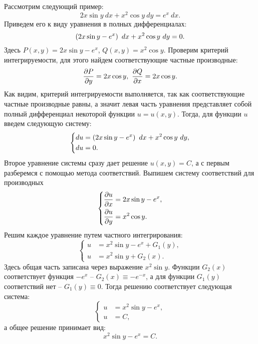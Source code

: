 		Рассмотрим следующий пример:
		\[ 2x \sin{y} ~ dx + x^2 \cos{y} ~ dy = e^{x} ~ dx. \]
		Приведем его к виду уравнения в полных дифференциалах:
		\[ \left( 2x \sin{y} - e^{x} \right) ~ dx + x^2 \cos{y} ~ dy = 0. \]
		Здесь $P(x, y) = 2x \sin{y} - e^{x}$, $Q(x, y) = x^2 \cos{y}$. Проверим критерий интегрируемости, для этого найдем соответствующие частные производные:
		\[ \dfrac{\partial P}{\partial y} = 2x \cos{y}, ~ \dfrac{\partial Q}{\partial x} = 2x \cos{y}. \]
		Как видим, критерий интегрируемости выполняется, так как соответствующие частные производные равны, а значит левая часть уравнения представляет собой полный дифференциал некоторой функции $u = u(x, y)$. Тогда, для функции $u$ введем следующую систему:
		\[ \left\lbrace \begin{split}
			du &= \left( 2x \sin{y} - e^{x} \right) ~ dx + x^2 \cos{y} ~ dy, \\
			du &= 0.
		\end{split} \right. \]
		Второе уравнение системы сразу дает решение $u(x, y) = C$, а с первым разберемся с помощью метода соответствий. Выпишем систему соответствий для производных
		\[ \left\lbrace \begin{split} 
			\dfrac{\partial u}{\partial x} &= 2x \sin{y} - e^{x}, \\ 
			\dfrac{\partial u}{\partial y} &= x^2 \cos{y}.
		\end{split} \right. \]
		Решим каждое уравнение путем частного интегрирования:
		\[ \left\lbrace \begin{split} 
			u &= x^2 \sin{y} - e^{x} + G_1(y), \\ 
			u &= x^2 \sin{y} + G_2(x).
		\end{split} \right. \]
		Здесь общая часть записана через выражение $x^2 \sin{y}$. Функции $G_2(x)$ соответствует функция $-e^{x}$ -- $G_2(x) \equiv -e^{-x}$, а для функции $G_1(y)$ соответствий нет -- $G_1(y) \equiv 0$. Тогда решению соответствует следующая система:
		\[ \left\lbrace \begin{split} u &= x^2 \sin{y} - e^{x}, \\ u &= C, \end{split} \right. \]
		а общее решение принимает вид:
		\[ x^2 \sin{y} - e^x = C. \]

